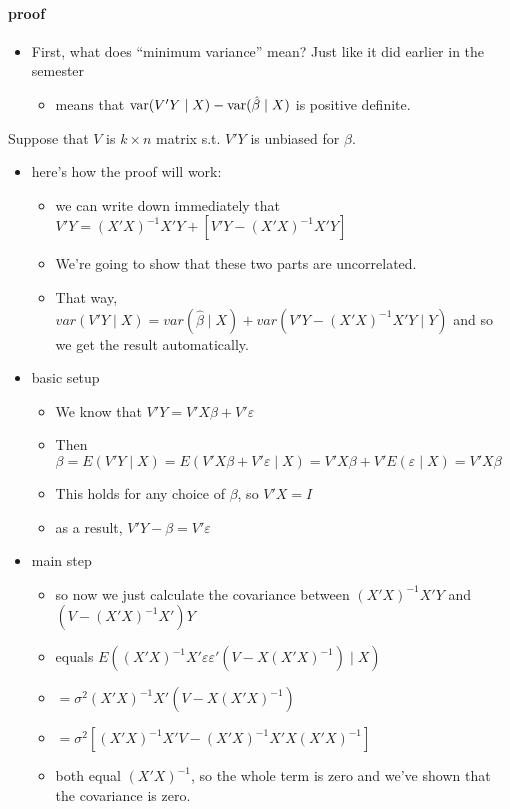 \paragraph{proof}
\begin{itemize}
\item First, what does ``minimum variance'' mean?  Just like it did
          earlier in the semester
\begin{itemize}
\item means that $\operatorname{var}(V'Y \mid X) - \operatorname{var}(\hat\beta \mid X)$ is
            positive definite.
\end{itemize}
\end{itemize}

        Suppose that $V$ is $k \times n$ matrix s.t. $V'Y$ is unbiased
        for $\beta$.
\begin{itemize}
\item here's how the proof will work:
\begin{itemize}
\item we can write down immediately that $V'Y = (X'X)^{-1}X'Y +
            [V'Y - (X'X)^{-1} X'Y]$
\item We're going to show that these two parts are uncorrelated.
\item That way, $var(V'Y \mid X) = var(\hat \beta \mid X) +
            var(V'Y - (X'X)^{-1}X'Y \mid Y)$ and so we get the result
            automatically.
\end{itemize}
\item basic setup
\begin{itemize}
\item We know that $V'Y = V'X\beta + V'\varepsilon$
\item Then $\beta = E(V'Y \mid X) = E(V'X\beta + V'\varepsilon \mid
            X) = V'X \beta + V'E(\varepsilon \mid X) = V'X\beta$
\item This holds for any choice of $\beta$, so $V'X = I$
\item as a result, $V'Y - \beta = V'\varepsilon$
\end{itemize}
\item main step
\begin{itemize}
\item so now we just calculate the covariance between
            $(X'X)^{-1}X'Y$ and $(V - (X'X)^{-1}X')Y$
\item equals $E((X'X)^{-1}X'\varepsilon \varepsilon'(V -
            X(X'X)^{-1}) \mid X)$
\item $= \sigma^2 (X'X)^{-1}X'(V - X(X'X)^{-1})$
\item $= \sigma^2 [(X'X)^{-1}X'V - (X'X)^{-1} X'X (X'X)^{-1}]$
\item both equal $(X'X)^{-1}$, so the whole term is zero and we've
            shown that the covariance is zero.
\end{itemize}
\end{itemize}

